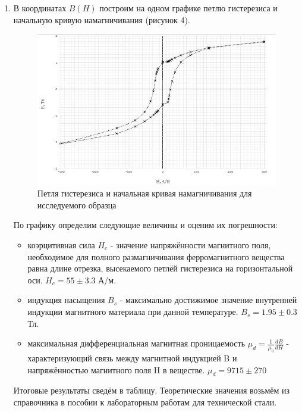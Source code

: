 \documentclass[a4paper]{article}
\begin{document}
\begin{enumerate}
\begin{table}[h]
\begin{tabular}{ |p{1.2cm}||p{1cm}|p{1cm}|p{1cm}|p{1cm}|p{1cm}|p{1cm}|p{1cm}|p{1cm}|p{1cm}|p{1cm}|p{1cm}|p{1cm}| }
    \end{tabular}
\end{table}

\item В координатах $B(H)$ построим на одном графике петлю гистерезиса и начальную кривую намагничивания (рисунок 4).

\begin{figure}[h]
    \centering
    \includegraphics[width=\textwidth]{graph1.PNG}
    \caption{Петля гистерезиса и начальная кривая намагничивания для исследуемого образца}
    \label{fig:vac}
\end{figure}

По графику определим следующие величины и оценим их погрешности:
\begin{itemize}
    \item коэрцитивная сила $H_c$ - значение напряжённости магнитного поля, необходимое для полного размагничивания ферромагнитного вещества равна длине отрезка, высекаемого петлёй гистерезиса на горизонтальной оси. $H_c = 55 \pm 3.3$ А/м.
    \item индукция насыщения $B_s$ -  максимально достижимое значение внутренней индукции магнитного материала при данной температуре. $B_s = 1.95 \pm 0.3$ Тл.
    \item максимальная дифференциальная магнитная проницаемость $\mu_d = \frac{1}{\mu_0}\frac{dB}{dH}$ - характеризующий связь между магнитной индукцией B и напряжённостью магнитного поля H в веществе. $\mu_d = 9715 \pm 270$
\end{itemize}

Итоговые результаты сведём в таблицу. Теоретические значения возьмём из справочника в пособии к лабораторным работам для технической стали.


\end{enumerate}
\end{document}
